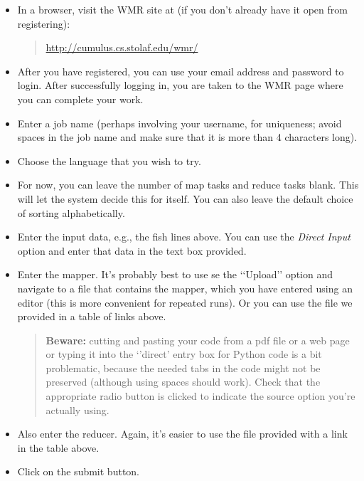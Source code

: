 \documentclass[letterpaper,10pt,openany,oneside]{sphinxmanual}
\begin{document}
\begin{itemize}
\item {} 
In a browser, visit the WMR site at (if you don't already have it
open from registering):
\begin{quote}

\href{http://cumulus.cs.stolaf.edu/wmr/}{http://cumulus.cs.stolaf.edu/wmr/}
\end{quote}

\item {} 
After you have registered, you can use your email address and
password to login. After successfully logging in, you are taken to
the WMR page where you can complete your work.

\item {} 
Enter a job name (perhaps involving your username, for uniqueness;
avoid spaces in the job name and make sure that it is more than 4
characters long).

\item {} 
Choose the language that you wish to try.

\item {} 
For now, you can leave the number of map tasks and reduce tasks
blank. This will let the system decide this for itself. You can
also leave the default choice of sorting alphabetically.

\item {} 
Enter the input data, e.g., the fish lines above. You can use the
\emph{Direct Input} option and enter that data in the text box
provided.

\item {} 
Enter the mapper. It's probably best to use se the {}`{}`Upload''
option and navigate to a file that contains the mapper, which you
have entered using an editor (this is more convenient for repeated
runs). Or you can use the file we provided in a table of links above.
\begin{quote}

\textbf{Beware:} cutting and pasting your code from a pdf file or
a web page or typing it into the {}`'direct' entry box for Python
code is a bit problematic, because the needed tabs in the code
might not be preserved (although using spaces should work). Check
that the appropriate radio button is clicked to indicate the source
option you're actually using.
\end{quote}

\item {} 
Also enter the reducer.  Again, it's easier to use the file provided
with a link in the table above.

\item {} 
Click on the submit button.

\end{itemize}
\end{document}
